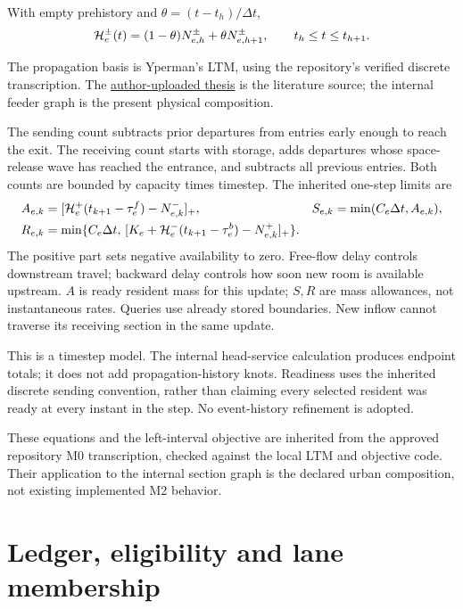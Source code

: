 \documentclass[10pt,a4paper]{article}
\newcommand{\pos}[1]{[#1]_+}
\begin{document}
With empty prehistory and $\theta=(t-t_h)/\Delta t$,
\begin{equation}
 {\cal H}^{\pm}_e(t)
 =(1-\theta)N^\pm_{e,h}+\theta N^\pm_{e,h+1},
 \qquad t_h\leq t\leq t_{h+1}.
 \label{eq:history}
\end{equation}

The propagation basis is Yperman's LTM, using the repository's verified
discrete transcription. The \href{https://www.researchgate.net/publication/28360292_The_Link_Transmission_Model_for_dynamic_network_loading}{author-uploaded thesis}
is the literature source; the internal feeder graph is the present
physical composition.
\par

The sending count subtracts prior departures from entries early enough
to reach the exit. The receiving count starts with storage, adds departures
whose space-release wave has reached the entrance, and subtracts all
previous entries. Both counts are bounded by capacity times timestep.
The inherited one-step limits are
\begin{align}
 A_{e,k}&=\pos{{\cal H}^+_e(t_{k+1}-\tau^f_e)-N^-_{e,k}},
 &S_{e,k}&=\min(C_e\Delta t,A_{e,k}),\label{eq:sending}\\
 R_{e,k}&=\min\{C_e\Delta t,\,
 \pos{K_e+{\cal H}^-_e(t_{k+1}-\tau^b_e)-N^+_{e,k}}\}.
 \label{eq:receiving}
\end{align}
The positive part sets negative availability to zero. Free-flow delay
controls downstream travel; backward delay controls how soon new room
is available upstream. $A$ is ready resident mass for this update;
$S,R$ are mass allowances,
not instantaneous rates. Queries use already stored boundaries.
New inflow cannot traverse its receiving section in the same update.

This is a timestep model. The internal head-service calculation produces
endpoint totals; it does not add propagation-history knots.
Readiness uses the inherited discrete sending convention, rather than
claiming every selected resident was ready at every instant in the step.
No event-history refinement is adopted.

These equations and the left-interval objective are inherited from the
approved repository M0 transcription, checked against the local LTM and
objective code. Their application to the internal section graph is the
declared urban composition, not existing implemented M2 behavior.

\section{Ledger, eligibility and lane membership}
\end{document}
